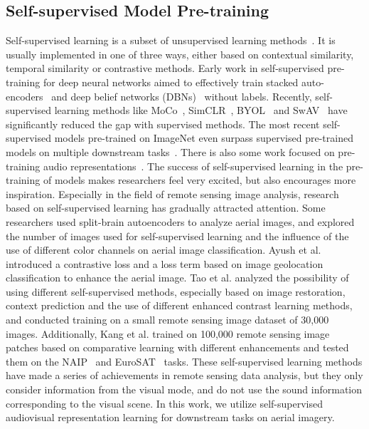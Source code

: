 \documentclass[journal]{IEEEtran}
\begin{document}
\subsection{Self-supervised Model Pre-training}
Self-supervised learning is a subset of unsupervised learning methods~\cite{jing2020self}.
It is usually implemented in one of three ways,
either based on contextual similarity, temporal similarity
or contrastive methods.
Early work in self-supervised pre-training for deep neural networks aimed to effectively train stacked auto-encoders~\cite{bengio2007greedy} and deep belief networks (DBNs)~\cite{hinton2006reducing} without labels.
Recently, self-supervised learning methods like MoCo~\cite{he_momentum_2020}, SimCLR~\cite{simclr}, BYOL~\cite{grill2020bootstrap} and SwAV~\cite{caron2020unsupervised}
have significantly reduced the gap with supervised methods.
The most recent self-supervised models pre-trained on ImageNet even surpass supervised pre-trained models on multiple downstream tasks~\cite{he_momentum_2020}.
There is also some work focused on pre-training audio representations~\cite{tagliasacchi2020pre}.
The success of self-supervised learning in the pre-training of models
makes researchers feel very excited,
but also encourages more inspiration.
Especially in the field of remote sensing image analysis, research based on self-supervised learning has gradually attracted attention.
Some researchers\cite{stojnic2018analysis,stojnic2018evaluation} used split-brain autoencoders
to analyze aerial images, and explored the number of images used for self-supervised learning and the influence of the use of different color channels on aerial image classification.
Ayush et al.\cite{ayush_geography-aware_2020} introduced a contrastive loss and a loss term
based on image geolocation classification to enhance the aerial image.
Tao et al.\cite{tao2020remote} analyzed the possibility of using different self-supervised 
methods, especially based on image restoration,
context prediction and the use of different enhanced contrast learning methods,
and conducted training on a small remote sensing image dataset of 30,000 images.
Additionally, Kang et al.\cite{kang2020deep} trained on 100,000 remote sensing image patches
based on comparative learning with different enhancements and tested them
on the NAIP~\cite{tile2vec} and EuroSAT~\cite{helber2019eurosat} tasks.
These self-supervised learning methods have made a series of achievements
in remote sensing data analysis,
but they only consider information from the visual mode,
and do not use the sound information corresponding to the visual scene.
In this work, we utilize self-supervised audiovisual representation
learning for downstream tasks on aerial imagery.
\end{document}
